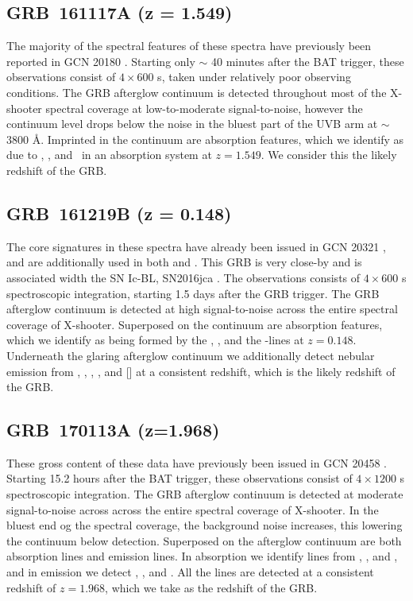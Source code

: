\documentclass{aa}    %
\begin{document}
\subsection{GRB~161117A (z = 1.549)}\label{161117}

The majority of the spectral features of these spectra have previously been
reported in GCN 20180 \citep{GCN20180}. Starting only $\sim$ 40 minutes after
the BAT trigger, these observations consist of $4 \times 600$ s, taken under
relatively poor observing conditions. The GRB afterglow continuum is detected
throughout most of the X-shooter spectral coverage at low-to-moderate
signal-to-noise, however the continuum level drops below the noise in the bluest
part of the UVB arm at $\sim$ 3800 \AA. Imprinted in the continuum are
absorption features, which we identify as due to \feii, \mgii, and \mgi~in an
absorption system at $z = 1.549$. We consider this the likely redshift of the
GRB.

\subsection{GRB~161219B (z = 0.148)}\label{161219}

The core signatures in these spectra have already been issued in GCN 20321
\citep{GCN20321}, and are additionally used in both \citet{Ashall2017} and
\citet{Cano2017}. This GRB is very close-by and is associated width the SN
Ic-BL, SN2016jca \citep[GCN 20342;][]{GCN20342}. The observations consists of $4
\times 600$ s spectroscopic integration, starting 1.5 days after the GRB
trigger. The GRB afterglow continuum is detected at high signal-to-noise across
the entire spectral coverage of X-shooter. Superposed on the continuum are
absorption features, which we identify as being formed by the \mgii, \mgi, and
the \cahk-lines at $z = 0.148$. Underneath the glaring afterglow continuum we
additionally detect nebular emission from \oii, \hb, \oiii, \ha, and [\sii] at a
consistent redshift, which is the likely redshift of the GRB.


\subsection{GRB~170113A (z=1.968)}\label{170113}

These gross content of these data have previously been issued in GCN 20458
\citep{GCN20458}. Starting 15.2 hours after the BAT trigger, these observations
consist of $4 \times 1200$ s spectroscopic integration. The GRB afterglow
continuum is detected at moderate signal-to-noise across across the entire
spectral coverage of X-shooter. In the bluest end og the spectral coverage, the
background noise increases, this lowering the continuum below detection.
Superposed on the afterglow continuum are both absorption lines and emission
lines. In absorption we identify lines from \SIii, \feii, and \mgii, and in
emission we detect \oii, \hb, and \oiii. All the lines are detected at a
consistent redshift of $z=1.968$, which we take as the redshift of the GRB.
\end{document}
